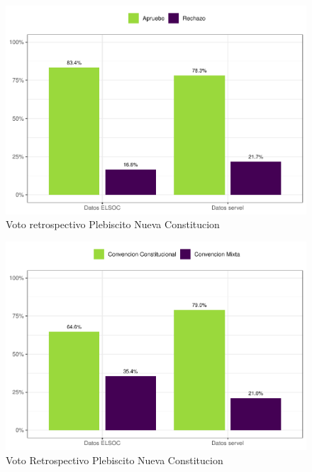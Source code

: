 \documentclass[
  12pt,
  openany]{book}
\begin{document}
\begin{figure}

{\centering \includegraphics{reporte-elsoc_files/figure-latex/servel-apruebo-1} 

}

\caption{Voto retrospectivo Plebiscito Nueva Constitucion}\label{fig:servel-apruebo}
\end{figure}

\begin{figure}

{\centering \includegraphics{reporte-elsoc_files/figure-latex/servel-cc-1} 

}

\caption{Voto Retrospectivo Plebiscito Nueva Constitucion}\label{fig:servel-cc}
\end{figure}
\end{document}
